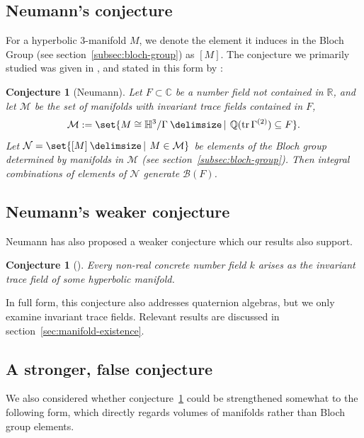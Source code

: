 \documentclass[10pt]{amsart}
\newtheorem{conjecture}[theorem]{Conjecture}
\numberwithin{equation}{theorem}
\theoremstyle{definition}
\providecommand\given{}
\newcommand\SetSymbol[1][]{%
  \nonscript\:#1\,\vert\,\allowbreak\nonscript\:\mathopen{}}
\renewcommand\given{\SetSymbol[\delimsize]}
\renewcommand\given{\SetSymbol[\delimsize]}
\DeclareMathOperator{\tr}{tr} \DeclareMathOperator{\vol}{vol}
\newcommand{\bloch}[1]{\mathcal{B}(#1)}
\newcommand{\invtracefield}[1]{\mathbb{Q}(\tr #1^{(2)})}
\begin{document}
\subsection{Neumann's conjecture}

For a hyperbolic $3$-manifold $M$, we denote the element it induces in
the Bloch Group (see section~\ref{subsec:bloch-group}) as $[M]$. The
conjecture we primarily studied was given in \parencite{neumann06},
and stated in this form by \parencite{garoufalidis2015}:

\begin{conjecture}[Neumann]
  \label{conj:neumann-main}
  Let $F \subset \mathbb{C}$ be a number field not contained in
  $\mathbb{R}$, and let $\mathcal{M}$ be the set of manifolds with
  invariant trace fields contained in $F$, \[ \mathcal{M} := \set{
  M \cong \mathbb{H}^3/\Gamma \given
      \invtracefield{\Gamma} \subseteq F }. \] Let
  $\mathcal{N} = \set{[M] \given M \in \mathcal{M}}$ be elements of the
  Bloch group determined by manifolds in $\mathcal{M}$ (see
  section~\ref{subsec:bloch-group}). Then integral
  combinations of elements of $\mathcal{N}$ generate $\bloch{F}$.
\end{conjecture}

\subsection{Neumann's weaker conjecture}

Neumann has also proposed a weaker conjecture which our results also
support.

\begin{conjecture}[{\parencite[Conjecture~1]{neumann06}}]
  \label{conj:neumann-weaker}
  Every non-real concrete number field $k$ arises as the invariant trace
  field of some hyperbolic manifold.
\end{conjecture}

In full form, this conjecture also addresses quaternion algebras, but
we only examine invariant trace fields. Relevant results are discussed
in section~\ref{sec:manifold-existence}.

\subsection{A stronger, false conjecture}

We also considered whether conjecture~\ref{conj:neumann-main} could be
strengthened somewhat to the following form, which directly regards
volumes of manifolds rather than Bloch group elements.
\end{document}
